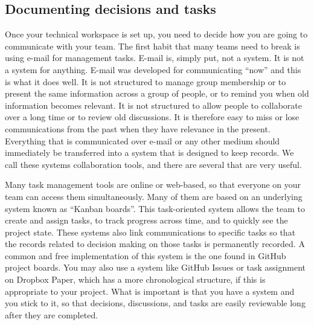 \subsection{Documenting decisions and tasks}

Once your technical workspace is set up,
you need to decide how you are going to communicate with your team.
The first habit that many teams need to break is using e-mail for management tasks.
E-mail is, simply put, not a system. It is not a system for anything.
E-mail was developed for communicating ``now'' and this is what it does well.
It is not structured to manage group membership or to present the same information
across a group of people, or to remind you when old information becomes relevant.
It is not structured to allow people to collaborate over a long time or to review old discussions.
It is therefore easy to miss or lose communications from the past when they have relevance in the present.
Everything that is communicated over e-mail or any other medium should
immediately be transferred into a system that is designed to keep records.
We call these systems collaboration tools, and there are several that are very useful.

Many task management tools are online or web-based,
so that everyone on your team can access them simultaneously.
Many of them are based on an underlying system known as ``Kanban boards''.
This task-oriented system allows the team to create and assign tasks,
to track progress across time, and to quickly see the project state.
These systems also link communications to specific tasks so that
the records related to decision making on those tasks is permanently recorded.
A common and free implementation of this system is the one found in GitHub project boards.
You may also use a system like GitHub Issues or task assignment on Dropbox Paper,
which has a more chronological structure, if this is appropriate to your project.
What is important is that you have a system and you stick to it,
so that decisions, discussions, and tasks are easily reviewable long after they are completed.

